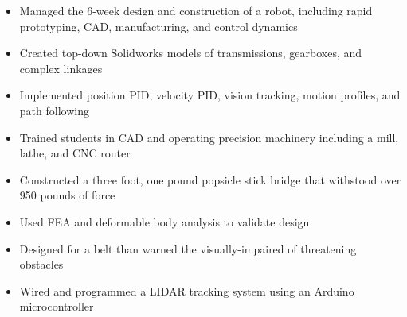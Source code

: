 \documentclass{resume}
\begin{document}
\begin{itemize}
  \item Managed the 6-week design and construction of a robot, including rapid prototyping, CAD, manufacturing, and control dynamics
  \item Created top-down Solidworks models of transmissions, gearboxes, and complex linkages
  \item Implemented position PID, velocity PID, vision tracking, motion profiles, and path following
  \item Trained students in CAD and operating precision machinery including a mill, lathe, and CNC router
\end{itemize}

\begin{itemize}
  \item Constructed a three foot, one pound popsicle stick bridge that withstood over 950 pounds of force
  \item Used FEA and deformable body analysis to validate design
\end{itemize}


\begin{itemize}
  \item Designed for a belt than warned the visually-impaired of threatening obstacles
  \item Wired and programmed a LIDAR tracking system using an Arduino microcontroller
\end{itemize}

\end{document}
